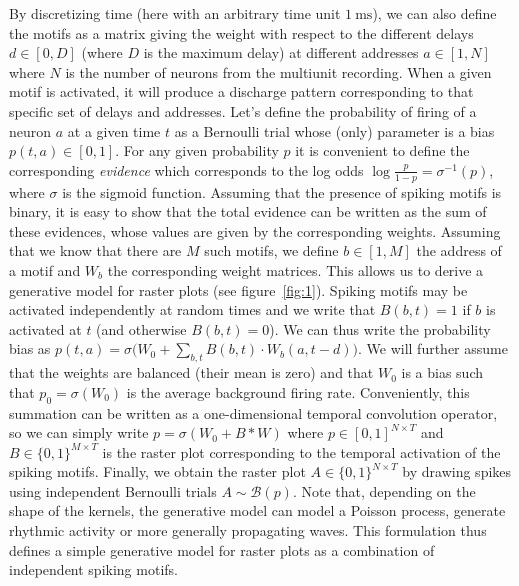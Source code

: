 \documentclass[11pt]{article}
\newcommand{\ms}{\si{\milli\second}}%
\begin{document}
By discretizing time (here with an arbitrary time unit $1~\ms$), we can also define the motifs as a matrix giving the weight with respect to the different delays $d \in [0, D]$ (where $D$ is the maximum delay) at different addresses $a \in [1, N]$ where $N$ is the number of neurons from the multiunit recording. 
When a given motif is activated, it will produce a discharge pattern corresponding to that specific set of delays and addresses. 
Let's define the probability of firing of a neuron $a$ at a given time $t$ as a Bernoulli trial whose (only) parameter is a bias $p(t, a) \in [0, 1]$. For any given probability $p$ it is convenient to define the corresponding \emph{evidence} which corresponds to the log odds $\log \frac{p}{1-p} = \sigma^{-1}(p)$, where $\sigma$ is the sigmoid function. 
Assuming that the presence of spiking motifs is binary, it is easy to show that the total evidence can be written as the sum of these evidences, whose values are given by the corresponding weights.
Assuming that we know that there are $M$ such motifs, we define $b \in [1, M]$ the address of a motif and $W_b$ the corresponding weight matrices. This allows us to derive a generative model for raster plots (see figure~\ref{fig:1}).
 Spiking motifs may be activated independently at random times and we write that $B(b, t)=1$ if $b$ is activated at $t$ (and otherwise $B(b, t)=0$). We can thus write the probability bias as %
$%
p(t, a) = \sigma\big(W_0 + \sum_{b, t} B(b, t) \cdot W_b(a, t-d) \big)  
$. We will further assume that the weights are balanced (their mean is zero) and that $W_0$ is a bias such that $p_0=\sigma(W_0)$ is the average background firing rate. Conveniently, this summation can be written as a one-dimensional temporal convolution operator, so we can simply write $p = \sigma(W_0 + B \ast W )$ where  $p\in [ 0, 1]^{N\times T}$ and $B\in \{0, 1\}^{M\times T}$ is the raster plot corresponding to the temporal activation of the spiking motifs. Finally, we obtain the raster plot $A\in \{0, 1\}^{N\times T}$ by drawing spikes using independent Bernoulli trials $A \sim \mathcal{B}(p)$. Note that, depending on the shape of the kernels, the generative model can model a Poisson process, generate rhythmic activity or more generally propagating waves. This formulation thus defines a simple generative model for raster plots as a combination of independent spiking motifs. 

\vspace{25pt}
\end{document}
